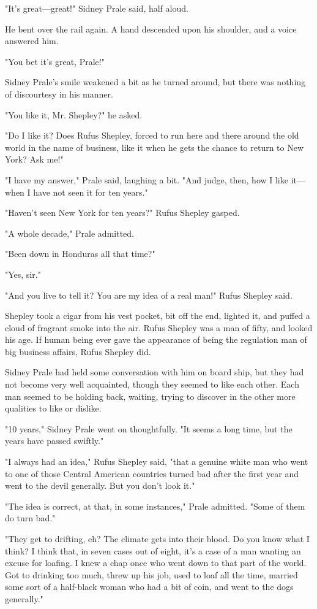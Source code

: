 \documentclass{novel}
\begin{document}
"It's great---great!" Sidney Prale said, half aloud.

He bent over the rail again. A hand descended upon his shoulder, and a voice answered him.

"You bet it's great, Prale!"

Sidney Prale's smile weakened a bit as he turned around, but there was nothing of discourtesy in his manner.

"You like it, Mr. Shepley?" he asked.

"Do I like it? Does Rufus Shepley, forced to run here and there around the old world in the name of business, like it when he gets the chance to return to New York? Ask me!"

"I have my answer," Prale said, laughing a bit. "And judge, then, how I like it---when I have not seen it for ten years."

"Haven't seen New York for ten years?" Rufus Shepley gasped.

"A whole decade," Prale admitted.

"Been down in Honduras all that time?"

"Yes, sir."

"And you live to tell it? You are my idea of a real man!" Rufus Shepley said.

Shepley took a cigar from his vest pocket, bit off the end, lighted it, and puffed a cloud of fragrant smoke into the air. Rufus Shepley was a man of fifty, and looked his age. If human being ever gave the appearance of being the regulation man of big business affairs, Rufus Shepley did.

Sidney Prale had held some conversation with him on board ship, but they had not become very well acquainted, though they seemed to like each other. Each man seemed to be holding back, waiting, trying to discover in the other more qualities to like or dislike.

"10 years," Sidney Prale went on thoughtfully. "It seems a long time, but the years have passed swiftly."

"I always had an idea," Rufus Shepley said, "that a genuine white man who went to one of those Central American countries turned bad after the first year and went to the devil generally. But you don't look it."

"The idea is correct, at that, in some instances," Prale admitted. "Some of them do turn bad."

"They get to drifting, eh? The climate gets into their blood. Do you know what I think? I think that, in seven cases out of eight, it's a case of a man wanting an excuse for loafing. I knew a chap once who went down to that part of the world. Got to drinking too much, threw up his job, used to loaf all the time, married some sort of a half-black woman who had a bit of coin, and went to the dogs generally."
\end{document}
